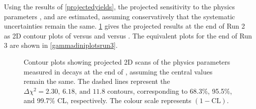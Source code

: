 
Using the results of \tab\ref{projectedyields}, the projected sensitivity to the physics parameters \rb, \deltab and \Pgamma are estimated, assuming conservatively that the systematic uncertainties remain the same. \Fig\ref{gammadiniplotsrun2} gives the projected results at the end of Run 2 as 2D contour plots of \rb versus \Pgamma and \deltab versus \Pgamma. The equivalent plots for the end of Run 3 are shown in \fig\ref{gammadiniplotsrun3}. 

\begin{figure}[h]
\centering
{}
\caption{Contour plots showing projected 2D scans of the physics parameters measured in \btodkst decays at the end of \runtwo, assuming the central values remain the same. The dashed lines represent the $\Delta \chi^2 = 2.30,\ 6.18,\ \text{and } 11.8$ contours, corresponding to 68.3\%, 95.5\%, and 99.7\% CL, respectively. The colour scale represents $(1 - \text{CL})$.}
\label{gammadiniplotsrun2}
\end{figure}

